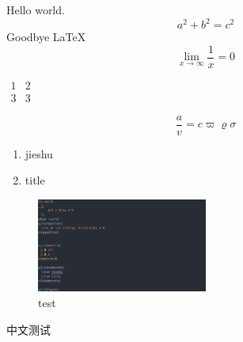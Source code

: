 \documentclass{article}
\begin{document}
\centering
Hello world.
    \[
        a^2 + b^2= c^2
    \]
Goodbye \LaTeX
\begin{equation}
    \lim_{x \to \infty} \frac{1}{x} = 0 
\end{equation}


$\begin{matrix}
    1 & 2\\
    3 & 3
\end{matrix}$

\begin{equation}
    \frac{a}{v}=c\varpi \varrho \sigma 
\end{equation}

\begin{enumerate}
    \item jieshu
    \item title
\end{enumerate}

\begin{figure}[h]
    \centering
    \includegraphics[width=0.5\textwidth]{2020-06-05-23-30-16.png}
    \caption{test}
\end{figure}

中文测试
\end{document}
